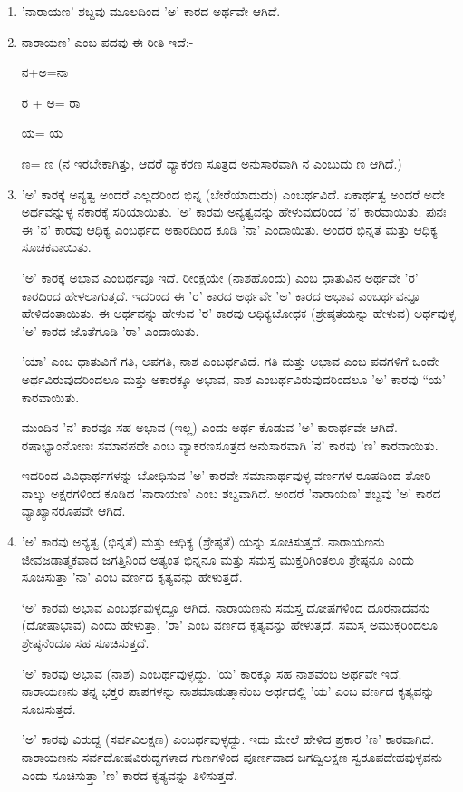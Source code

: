 \begin{enumerate}
\item 'ನಾರಾಯಣ' ಶಬ್ದವು ಮೂಲದಿಂದ 'ಅ' ಕಾರದ ಅರ್ಥವೇ ಆಗಿದೆ.

 \item 
 ನಾರಾಯಣ' ಎಂಬ ಪದವು ಈ ರೀತಿ ಇದೆ:-

 ನ+ಅ=ನಾ

 ರ + ಅ= ರಾ

 ಯ= ಯ

 ಣ= ಣ (ನ ಇರಬೇಕಾಗಿತ್ತು, ಆದರೆ ವ್ಯಾಕರಣ ಸೂತ್ರದ ಅನುಸಾರವಾಗಿ ನ ಎಂಬುದು ಣ ಆಗಿದೆ.)

 \item 
 'ಅ' ಕಾರಕ್ಕೆ ಅನ್ಯತ್ವ ಅಂದರೆ ಎಲ್ಲದರಿಂದ ಭಿನ್ನ (ಬೇರೆಯಾದುದು) ಎಂಬರ್ಥವಿದೆ. ಏಕಾರ್ಥತ್ವ ಅಂದರೆ ಅದೇ ಅರ್ಥವನ್ನುಳ್ಳ ನಕಾರಕ್ಕೆ ಸರಿಯಾಯಿತು. 'ಅ' ಕಾರವು ಅನ್ಯತ್ವವನ್ನು ಹೇಳುವುದರಿಂದ 'ನ' ಕಾರವಾಯಿತು. ಪುನಃ ಈ 'ನ' ಕಾರವು ಆಧಿಕ್ಯ ಎಂಬರ್ಥದ ಅಕಾರದಿಂದ ಕೂಡಿ 'ನಾ' ಎಂದಾಯಿತು. ಅಂದರೆ ಭಿನ್ನತೆ ಮತ್ತು ಆಧಿಕ್ಯ ಸೂಚಕವಾಯಿತು.

 'ಅ' ಕಾರಕ್ಕೆ ಅಭಾವ ಎಂಬರ್ಥವೂ ಇದೆ. ರೀಂಕ್ಷಯೇ (ನಾಶಹೊಂದು) ಎಂಬ ಧಾತುವಿನ ಅರ್ಥವೇ 'ರ' ಕಾರದಿಂದ ಹೇಳಲಾಗುತ್ತದೆ. ಇದರಿಂದ ಈ 'ರ' ಕಾರದ ಅರ್ಥವೇ 'ಅ' ಕಾರದ ಅಭಾವ ಎಂಬರ್ಥವನ್ನೂ ಹೇಳಿದಂತಾಯಿತು. ಈ ಅರ್ಥವನ್ನು ಹೇಳುವ 'ರ' ಕಾರವು ಆಧಿಕ್ಯಬೋಧಕ (ಶ್ರೇಷ್ಠತೆಯನ್ನು ಹೇಳುವ) ಅರ್ಥವುಳ್ಳ 'ಅ' ಕಾರದ ಜೊತೆಗೂಡಿ 'ರಾ' ಎಂದಾಯಿತು.

 'ಯಾ' ಎಂಬ ಧಾತುವಿಗೆ ಗತಿ, ಅಪಗತಿ, ನಾಶ ಎಂಬರ್ಥವಿದೆ. ಗತಿ ಮತ್ತು ಅಭಾವ ಎಂಬ ಪದಗಳಿಗೆ ಒಂದೇ ಅರ್ಥವಿರುವುದರಿಂದಲೂ ಮತ್ತು ಅಕಾರಕ್ಕೂ ಅಭಾವ, ನಾಶ ಎಂಬರ್ಥವಿರುವುದರಿಂದಲೂ 'ಅ' ಕಾರವು “ಯ' ಕಾರವಾಯಿತು.

 ಮುಂದಿನ 'ನ' ಕಾರವೂ ಸಹ ಅಭಾವ (ಇಲ್ಲ) ಎಂದು ಅರ್ಥ ಕೊಡುವ 'ಅ' ಕಾರಾರ್ಥವೇ ಆಗಿದೆ. ರಷಾಭ್ಯಾಂನೋಣಃ ಸಮಾನಪದೇ ಎಂಬ ವ್ಯಾಕರಣಸೂತ್ರದ ಅನುಸಾರವಾಗಿ 'ನ' ಕಾರವು 'ಣ' ಕಾರವಾಯಿತು.

 ಇದರಿಂದ ವಿವಿಧಾರ್ಥಗಳನ್ನು ಬೋಧಿಸುವ 'ಅ' ಕಾರವೇ ಸಮಾನಾರ್ಥವುಳ್ಳ ವರ್ಣಗಳ ರೂಪದಿಂದ ತೋರಿ ನಾಲ್ಕು ಅಕ್ಷರಗಳಿಂದ ಕೂಡಿದ 'ನಾರಾಯಣ' ಎಂಬ ಶಬ್ದವಾಗಿದೆ. ಅಂದರೆ 'ನಾರಾಯಣ' ಶಬ್ದವು 'ಅ' ಕಾರದ ವ್ಯಾಖ್ಯಾನರೂಪವೇ ಆಗಿದೆ.

 \item 
 'ಅ' ಕಾರವು ಅನ್ಯತ್ವ (ಭಿನ್ನತೆ) ಮತ್ತು ಆಧಿಕ್ಯ (ಶ್ರೇಷ್ಠತೆ) ಯನ್ನು ಸೂಚಿಸುತ್ತದೆ. ನಾರಾಯಣನು ಜೀವಜಡಾತ್ಮಕವಾದ ಜಗತ್ತಿನಿಂದ ಅತ್ಯಂತ ಭಿನ್ನನೂ ಮತ್ತು ಸಮಸ್ತ ಮುಕ್ತರಿಗಿಂತಲೂ ಶ್ರೇಷ್ಠನೂ ಎಂದು ಸೂಚಿಸುತ್ತಾ 'ನಾ' ಎಂಬ ವರ್ಣದ ಕೃತ್ಯವನ್ನು ಹೇಳುತ್ತದೆ.

 `ಅ' ಕಾರವು ಅಭಾವ ಎಂಬರ್ಥವುಳ್ಳದ್ದೂ ಆಗಿದೆ. ನಾರಾಯಣನು ಸಮಸ್ತ ದೋಷಗಳಿಂದ ದೂರನಾದವನು (ದೋಷಾಭಾವ) ಎಂದು ಹೇಳುತ್ತಾ, 'ರಾ' ಎಂಬ ವರ್ಣದ ಕೃತ್ಯವನ್ನು ಹೇಳುತ್ತದೆ. ಸಮಸ್ತ ಅಮುಕ್ತರಿಂದಲೂ ಶ್ರೇಷ್ಠನೆಂದೂ ಸಹ ಸೂಚಿಸುತ್ತದೆ. 

 'ಅ' ಕಾರವು ಅಭಾವ (ನಾಶ) ಎಂಬರ್ಥವುಳ್ಳದ್ದು. 'ಯ' ಕಾರಕ್ಕೂ ಸಹ ನಾಶವೆಂಬ ಅರ್ಥವೇ ಇದೆ. ನಾರಾಯಣನು ತನ್ನ ಭಕ್ತರ ಪಾಪಗಳನ್ನು ನಾಶಮಾಡುತ್ತಾನೆಂಬ ಅರ್ಥದಲ್ಲಿ 'ಯ' ಎಂಬ ವರ್ಣದ ಕೃತ್ಯವನ್ನು ಸೂಚಿಸುತ್ತದೆ. 

 'ಅ' ಕಾರವು ವಿರುದ್ದ (ಸರ್ವವಿಲಕ್ಷಣ) ಎಂಬರ್ಥವುಳ್ಳದ್ದು. ಇದು ಮೇಲೆ ಹೇಳಿದ ಪ್ರಕಾರ 'ಣ' ಕಾರವಾಗಿದೆ. ನಾರಾಯಣನು ಸರ್ವದೋಷವಿರುದ್ದಗಳಾದ ಗುಣಗಳಿಂದ ಪೂರ್ಣವಾದ ಜಗದ್ವಿಲಕ್ಷಣ ಸ್ವರೂಪದೇಹವುಳ್ಳವನು ಎಂದು ಸೂಚಿಸುತ್ತಾ 'ಣ' ಕಾರದ ಕೃತ್ಯವನ್ನು ತಿಳಿಸುತ್ತದೆ.

\end{enumerate}

